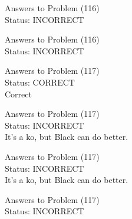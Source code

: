 \documentclass[11pt]{article}
\begin{document}
\begin{minipage}[t]{0.5\textwidth}
  {\centering
  
  Answers to Problem (116)\\
  Status: INCORRECT\\
  
  }
\end{minipage}
\begin{minipage}[t]{0.5\textwidth}
  {\centering
  
  Answers to Problem (116)\\
  Status: INCORRECT\\
  
  }
\end{minipage}
\begin{minipage}[t]{0.5\textwidth}
  {\centering
  
  Answers to Problem (117)\\
  Status: CORRECT\\
  Correct\\
  }
\end{minipage}
\begin{minipage}[t]{0.5\textwidth}
  {\centering
  
  Answers to Problem (117)\\
  Status: INCORRECT\\
  It's a ko, but Black can do better.\\
  }
\end{minipage}
\begin{minipage}[t]{0.5\textwidth}
  {\centering
  
  Answers to Problem (117)\\
  Status: INCORRECT\\
  It's a ko, but Black can do better.\\
  }
\end{minipage}
\begin{minipage}[t]{0.5\textwidth}
  {\centering
  
  Answers to Problem (117)\\
  Status: INCORRECT\\
  
  }
\end{minipage}
\end{document}
